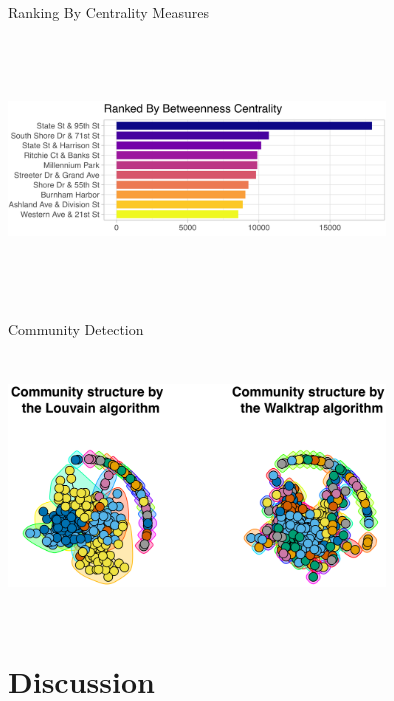 \documentclass[11pt, xcolor=dvipsnames]{beamer}
\begin{document}
\begin{frame}{Ranking By Centrality Measures}
	
	\centering
	\includegraphics[width=10cm, height=7cm]{images/betweenness-ranking}
	
\end{frame}

\begin{frame}{Community Detection}
	
	\centering
	\includegraphics[width=10cm, height=7cm]{images/community-detection}
	
\end{frame}
\section{Discussion}
\end{document}
